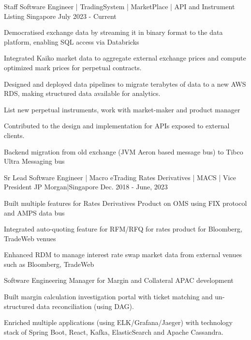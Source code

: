 \begin{cventries}
  {Staff Software Engineer | TradingSystem | MarketPlace | API and Instrument Listing }
  {Singapore}
  {July 2023 - Current}
  {
    \begin{cvitems}
      \item {Democratised exchange data by streaming it in binary format to the data platform, enabling SQL access via Databricks}
      \item {Integrated Kaiko market data to aggregate external exchange prices and compute optimized mark prices for perpetual contracts.}
      \item {Designed and deployed data pipelines to migrate terabytes of data to a new AWS RDS, making structured data available for analytics.}
      \item {List new perpetual instruments, work with market-maker and product manager}
      \item {Contributed to the design and implementation for APIs exposed to external clients.}
      \item {Backend migration from old exchange (JVM Aeron based message bus) to Tibco Ultra Messaging bus}
    \end{cvitems}
  }
    {Sr Lead Software Engineer | Macro eTrading Rates Derivatives | MACS | Vice President }
    {JP Morgan|Singapore}
    {Dec. 2018 - June, 2023}
    {
      \begin{cvitems}
        \item {Built multiple features for Rates Derivatives Product on OMS using FIX protocol and AMPS data bus}
        \item {Integrated auto-quoting feature for RFM/RFQ for rates product for Bloomberg, TradeWeb venues}
        \item {Enhanced RDM to manage interest rate swap market data from external venues such as Bloomberg, TradeWeb}
        \item {Software Engineering Manager for Margin and Collateral APAC development}
        \item {Built margin calculation investigation portal with ticket matching and un-structured data reconciliation (using DAG).}
        \item {Enriched multiple applications (using ELK/Grafana/Jaeger) with technology stack of Spring Boot, React, Kafka, ElasticSearch and Apache Cassandra.}
      \end{cvitems}
}
\end{cventries}

